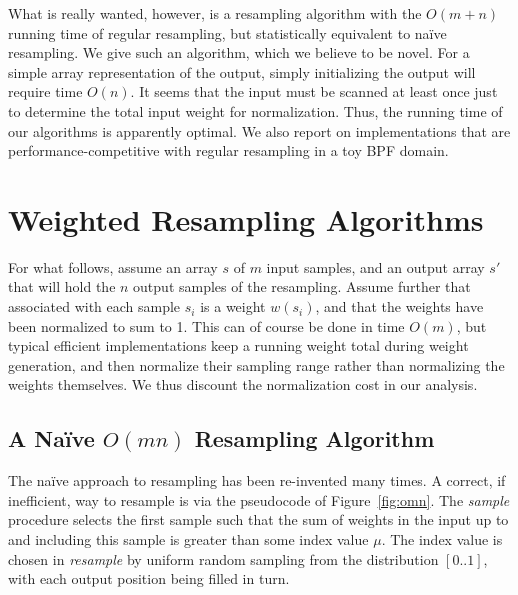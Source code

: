 \documentclass{article}
\begin{document}
  What is really wanted, however, is a resampling algorithm
  with the $O(m + n)$ running time of regular resampling,
  but statistically equivalent to na\"ive resampling.  We
  give such an algorithm, which we believe to be novel.  For
  a simple array representation of the output, simply
  initializing the output will require time $O(n)$.  It
  seems that the input must be scanned at least once just to
  determine the total input weight for normalization.  Thus,
  the running time of our algorithms is apparently optimal.
  We also report on implementations that are
  performance-competitive with regular resampling in a toy
  BPF domain.

\section{Weighted Resampling Algorithms}

  For what follows, assume an array $s$ of $m$ input
  samples, and an output array $s'$ that will hold the $n$
  output samples of the resampling.  Assume further that
  associated with each sample $s_i$ is a weight $w(s_i)$,
  and that the weights have been normalized to sum to 1.
  This can of course be done in time $O(m)$, but typical
  efficient implementations keep a running weight total
  during weight generation, and then normalize their
  sampling range rather than normalizing the weights
  themselves.  We thus discount the normalization cost in
  our analysis.

\subsection{A Na\"ive $O(mn)$ Resampling Algorithm}\label{sec:naive}

  The na\"ive approach to resampling has been re-invented
  many times.  A correct, if inefficient, way to resample is
  via the pseudocode of Figure~\ref{fig:omn}.  The {\em
  sample} procedure selects the first sample such that the
  sum of weights in the input up to and including this
  sample is greater than some index value $\mu$.  The index
  value is chosen in {\em resample} by uniform random
  sampling from the distribution $[0..1]$, with each output
  position being filled in turn.
\end{document}
